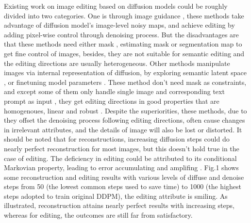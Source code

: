 \documentclass[letterpaper]{article} %
\begin{document}
Existing work on image editing based on diffusion models could be roughly divided into two categories. One is through image guidance \cite{nichol2021glide, yang2023paint}, these methods take advantage of diffusion model's image-level noisy maps, and achieve editing by adding pixel-wise control through denoising process. But the disadvantages are that these methods need either mask \cite{avrahami2022blended}, estimating mask \cite{couairon2022diffedit} or segmentation map \cite{matsunaga2022fine} to get fine control of images, besides, they are not suitable for semantic editing and the editing directions are usually heterogeneous. Other methods manipulate images via internal representation of diffusion, by exploring semantic latent space \cite{kwon2022diffusion, preechakul2022diffusion}, or finetuning model parameters \cite{kim2022diffusionclip, kawar2023imagic}. These method don't need mask as constraints, and except some of them only handle single image and corresponding text prompt as input \cite{hertz2022prompt, kawar2023imagic}, they get editing directions in good properties that are homogenoues, linear and robust \cite{kwon2022diffusion}. Despite the superiorities, these methods, due to they offset the denoising process following editing directions, often cause changes in irrelevant attributes, and the details of image will also be lost or distorted. It should be noted that for reconstructions, increasing diffusion steps could do nearly perfect reconstruction for most images, but this doesn't hold true in the case of editing. The deficiency in editing could be attributed to its conditional Markovian property, leading to error accumulating and amplifing \cite{mokady2023null}. Fig.1 shows some reconstruction and editing results with various levels of diffuse and denoise steps from 50 (the lowest common steps used to save time) to 1000 (the highest steps adopted to train original DDPM), the editing attribute is smiling. As illustrated, reconstruction attains nearly perfect results with increasing steps, whereas for editing, the outcomes are still far from satisfactory.
\end{document}
